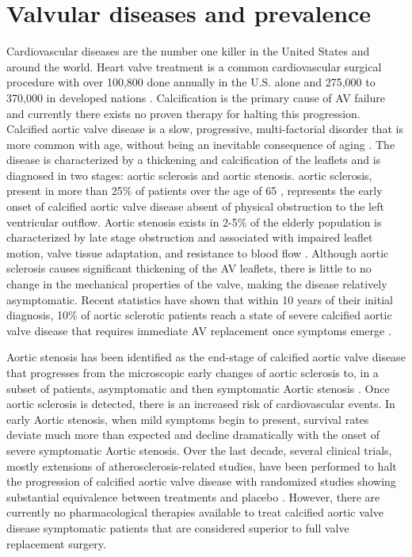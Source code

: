 \section{Valvular diseases and prevalence}

    Cardiovascular diseases are the number one killer in the United States and around the world. Heart valve treatment is a common cardiovascular surgical procedure with over 100,800 done annually in the U.S. alone \cite{mozaffarian_heart_2016} and 275,000 to 370,000 in developed nations \cite{manji_future_2012}. Calcification is the primary cause of AV failure and currently there exists no proven therapy for halting this progression. Calcified aortic valve disease is a slow, progressive, multi-factorial disorder that is more common with age, without being an inevitable consequence of aging \cite{towler_molecular_2013,freeman_management_2002,freeman_spectrum_2005,kurtz_aortic_2010,beckmann_insights_2010}. The disease is characterized by a thickening and calcification of the leaflets and is diagnosed in two stages: aortic sclerosis and aortic stenosis. aortic sclerosis, present in more than 25\% of patients over the age of 65 \cite{obrien_pathogenesis_2006}, represents the early onset of calcified aortic valve disease absent of physical obstruction to the left ventricular outflow. Aortic stenosis exists in 2-5\% of the elderly population \cite{obrien_pathogenesis_2006} is characterized by late stage obstruction and associated with impaired leaflet motion, valve tissue adaptation, and resistance to blood flow \cite{poggio_noggin_2013,grau_analysis_2012,gharacholou_aortic_2011,pflederer_aortic_2010} . Although aortic sclerosis causes significant thickening of the AV leaflets, there is little to no change in the mechanical properties of the valve, making the disease relatively asymptomatic. Recent statistics have shown that within 10 years of their initial diagnosis, 10\% of aortic sclerotic patients reach a state of severe calcified aortic valve disease that requires immediate AV replacement once symptoms emerge \cite{gharacholou_aortic_2011}. 
    
    
    Aortic stenosis has been identified as the end-stage of calcified aortic valve disease that progresses from the microscopic early changes of aortic sclerosis to, in a subset of patients, asymptomatic and then symptomatic Aortic stenosis \cite{kurtz_aortic_2010,otto_calcific_2010,aikawa_look_2012}. Once aortic sclerosis is detected, there is an increased risk of cardiovascular events. In early Aortic stenosis, when mild symptoms begin to present, survival rates deviate much more than expected and decline dramatically with the onset of severe symptomatic Aortic stenosis. Over the last decade, several clinical trials, mostly extensions of atherosclerosis-related studies, have been performed to halt the progression of calcified aortic valve disease with randomized studies showing substantial equivalence between treatments and placebo \cite{parolari_do_2011,moura_rosuvastatin_2007,cowell_randomized_2005,benton_statins_2009,rossebo_intensive_2008}. However, there are currently no pharmacological therapies available to treat calcified aortic valve disease symptomatic patients that are considered superior to full valve replacement surgery. 


